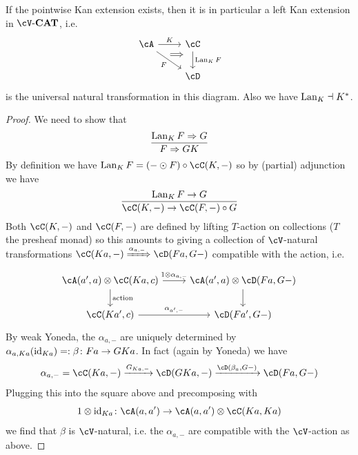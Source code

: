 \documentclass[a4paper,11pt,oneside,openany]{scrbook}
\begin{document}
\begin{prop}
	If the pointwise Kan extension exists, then it is in particular a left Kan
    extension in $ \cV \text{-} \CAT $, i.e.
	\begin{displaymath}
		\begin{tikzcd}
			\cA \arrow[r, "K"]\arrow[rd,"F"', 	""{name=F,marking,near start}] 	 &
			\cC \arrow[d, "{\Lan_K F}",		""{name=L,marking,above, near start}]	\\
			& \cD
			\arrow[Rightarrow, from=F, to=L, shorten <=10pt, shorten >=10pt, start anchor={north west}, end anchor={[yshift=1pt]}]
		\end{tikzcd}
	\end{displaymath}
	is the universal natural transformation in this diagram.
	Also we have $ \operatorname{Lan}_K \dashv K^* $.
\end{prop}
\begin{proof}
	We need to show that
	\begin{displaymath}
		\frac{\operatorname{Lan}_K F \Rightarrow G}{F \Rightarrow GK}
	\end{displaymath}
	By definition we have $ \Lan_K F = (- \odot F) \circ\cC(K,-) $ so by
    (partial) adjunction we have
	\begin{displaymath}
		\frac{\Lan_K F \to G}{\cC(K,-) \to\cC(F,-)\circ G}
	\end{displaymath}
	Both $\cC(K,-) $ and $\cC(F ,-) $ are defined by lifting $ T $-action on
    collections ($ T $ the presheaf monad) so this amounts to giving a
    collection of $ \cV $-natural transformations
	$ \cC(Ka,-) \xRightarrow{\alpha_{a,-}} \cD(Fa,G-) $ compatible with the
    action, i.e.
	\begin{displaymath}
		\begin{tikzcd}
			{\cA(a',a) \otimes \cC(Ka,c)}
			\arrow[r, "1\otimes \alpha_{a,-}"]
			\arrow[d,"\text{action}"]
			& {\cA(a',a)} \otimes \cD(Fa,G-) \arrow[d]\\
			{\cC(Ka',c)} \arrow[r, "{\alpha_{a',-}}"] &{\cD(Fa',G-)}
		\end{tikzcd}
	\end{displaymath}
	By weak Yoneda, the $ \alpha_{a,-} $ are uniquely determined by $ \alpha_{a,Ka}(\operatorname{id}_{Ka}) =: \beta \colon Fa \to GKa $.
	In fact (again by Yoneda) we have
	\begin{displaymath}
		\alpha_{a,-} = \cC(Ka,-) \xrightarrow{G_{Ka,-}} \cD(GKa,-) \xrightarrow{\cD(\beta_a, G-)} \cD(Fa, G-)
	\end{displaymath}
	Plugging this into the square above and precomposing with
	\begin{displaymath}
		1\otimes \id_{Ka} \from \cA(a,a') \to \cA(a,a')\otimes \cC(Ka,Ka)
	\end{displaymath}
	we find that $ \beta $ is $ \cV $-natural, i.e. the $ \alpha_{a,-} $ are
    compatible with the $ \cV $-action as above.
\end{proof}
\end{document}
